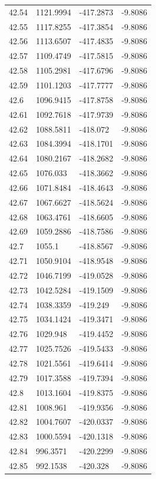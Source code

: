 \begin{table}[H]
\begin{tabular}{llll}
42.54 & 1121.9994 & -417.2873 & -9.8086 \\
42.55 & 1117.8255 & -417.3854 & -9.8086 \\
42.56 & 1113.6507 & -417.4835 & -9.8086 \\
42.57 & 1109.4749 & -417.5815 & -9.8086 \\
42.58 & 1105.2981 & -417.6796 & -9.8086 \\
42.59 & 1101.1203 & -417.7777 & -9.8086 \\
42.6 & 1096.9415 & -417.8758 & -9.8086 \\
42.61 & 1092.7618 & -417.9739 & -9.8086 \\
42.62 & 1088.5811 & -418.072 & -9.8086 \\
42.63 & 1084.3994 & -418.1701 & -9.8086 \\
42.64 & 1080.2167 & -418.2682 & -9.8086 \\
42.65 & 1076.033 & -418.3662 & -9.8086 \\
42.66 & 1071.8484 & -418.4643 & -9.8086 \\
42.67 & 1067.6627 & -418.5624 & -9.8086 \\
42.68 & 1063.4761 & -418.6605 & -9.8086 \\
42.69 & 1059.2886 & -418.7586 & -9.8086 \\
42.7 & 1055.1 & -418.8567 & -9.8086 \\
42.71 & 1050.9104 & -418.9548 & -9.8086 \\
42.72 & 1046.7199 & -419.0528 & -9.8086 \\
42.73 & 1042.5284 & -419.1509 & -9.8086 \\
42.74 & 1038.3359 & -419.249 & -9.8086 \\
42.75 & 1034.1424 & -419.3471 & -9.8086 \\
42.76 & 1029.948 & -419.4452 & -9.8086 \\
42.77 & 1025.7526 & -419.5433 & -9.8086 \\
42.78 & 1021.5561 & -419.6414 & -9.8086 \\
42.79 & 1017.3588 & -419.7394 & -9.8086 \\
42.8 & 1013.1604 & -419.8375 & -9.8086 \\
42.81 & 1008.961 & -419.9356 & -9.8086 \\
42.82 & 1004.7607 & -420.0337 & -9.8086 \\
42.83 & 1000.5594 & -420.1318 & -9.8086 \\
42.84 & 996.3571 & -420.2299 & -9.8086 \\
42.85 & 992.1538 & -420.328 & -9.8086 \\

\end{tabular}
\end{table}
